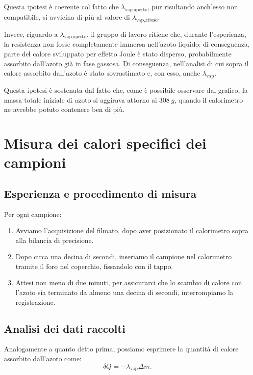 \documentclass{article}
\begin{document}
Questa ipotesi è coerente col fatto che $\lambda_\text{vap,aperto}$,
pur risultando anch'esso non compatibile, si avvicina di più al valore
di $\lambda_\text{vap,atteso}$.

\vspace{2mm}
Invece, riguardo a $\lambda_\text{vap,aperto}$, il gruppo di
lavoro ritiene che, durante l'esperienza, la resistenza non fosse
completamente immersa nell'azoto liquido: di conseguenza, parte
del calore sviluppato per effetto Joule è stato disperso,
probabilmente assorbito dall'azoto già in fase gassosa.
Di conseguenza, nell'analisi di cui sopra il calore assorbito
dall'azoto è stato sovrastimato e, con esso, anche
$\lambda_\text{vap}$.

Questa ipotesi è sostenuta dal fatto che, come è possibile
osservare dal grafico, la massa totale iniziale di azoto si
aggirava attorno ai $\qty{308}{g}$, quando il calorimetro ne
avrebbe potuto contenere ben di più.

\section{Misura dei calori specifici dei campioni}

\subsection{Esperienza e procedimento di misura}

Per ogni campione:
\begin{enumerate}
  \item
    Avviamo l'acquisizione del filmato, dopo aver posizionato il calorimetro
    sopra alla bilancia di precisione.
  \item
    Dopo circa una decina di secondi, inseriamo il campione nel calorimetro
    tramite il foro nel coperchio, fissandolo con il tappo.
  \item
    Attesi non meno di due minuti, per assicurarci che lo scambio di calore con
    l'azoto sia terminato da almeno una decina di secondi, interrompiamo
    la registrazione.
\end{enumerate}

\subsection{Analisi dei dati raccolti}
Analogamente a quanto detto prima, possiamo esprimere la quantità di calore
assorbito dall'azoto come:
\[
  \delta Q = - \lambda_\text{vap} \Delta m.
\]
\end{document}
